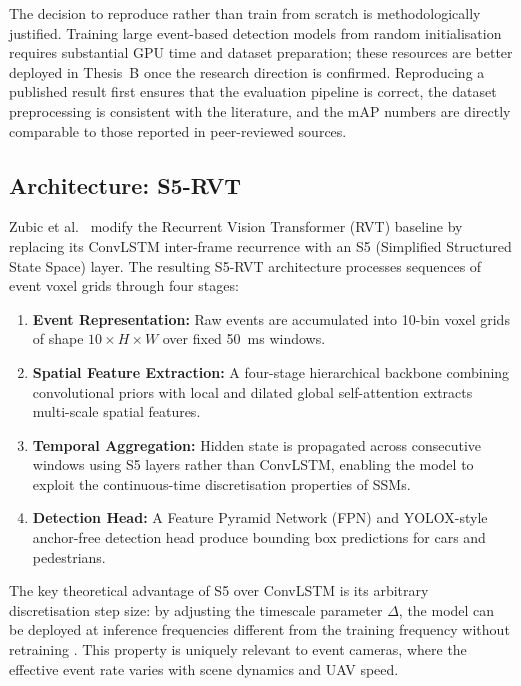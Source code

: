 \documentclass[11pt, a4paper]{report}
\begin{document}
The decision to reproduce rather than train from scratch is methodologically justified. Training large event-based detection models from random initialisation requires substantial GPU time and dataset preparation; these resources are better deployed in Thesis~B once the research direction is confirmed. Reproducing a published result first ensures that the evaluation pipeline is correct, the dataset preprocessing is consistent with the literature, and the mAP numbers are directly comparable to those reported in peer-reviewed sources.

\subsection{Architecture: S5-RVT}
\label{subsec:mvp_arch}

Zubic et al.\ \cite{zubic2024state} modify the Recurrent Vision Transformer (RVT) baseline \cite{gehrig2023recurrent} by replacing its ConvLSTM inter-frame recurrence with an S5 (Simplified Structured State Space) layer. The resulting S5-RVT architecture processes sequences of event voxel grids through four stages:

\begin{enumerate}
    \item \textbf{Event Representation:} Raw events are accumulated into 10-bin voxel grids of shape $10 \times H \times W$ over fixed 50~ms windows.
    \item \textbf{Spatial Feature Extraction:} A four-stage hierarchical backbone combining convolutional priors with local and dilated global self-attention extracts multi-scale spatial features.
    \item \textbf{Temporal Aggregation:} Hidden state is propagated across consecutive windows using S5 layers rather than ConvLSTM, enabling the model to exploit the continuous-time discretisation properties of SSMs.
    \item \textbf{Detection Head:} A Feature Pyramid Network (FPN) and YOLOX-style anchor-free detection head produce bounding box predictions for cars and pedestrians.
\end{enumerate}

The key theoretical advantage of S5 over ConvLSTM is its arbitrary discretisation step size: by adjusting the timescale parameter $\Delta$, the model can be deployed at inference frequencies different from the training frequency without retraining \cite{zubic2024state}. This property is uniquely relevant to event cameras, where the effective event rate varies with scene dynamics and UAV speed.
\end{document}
